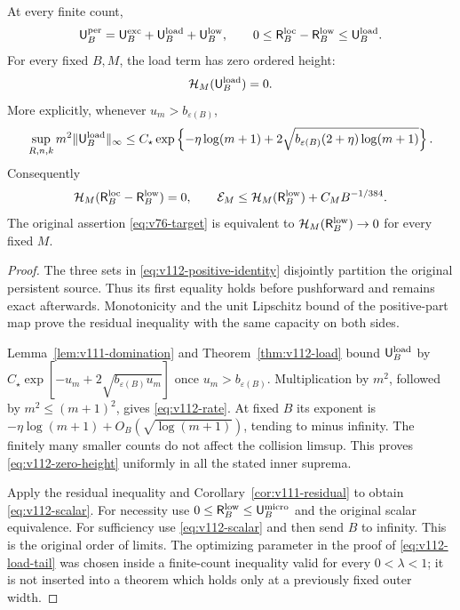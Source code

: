 \begin{theorem}
\label{thm:v112-payment}
At every finite count,
\begin{equation}\label{eq:v112-positive-identity}
 \mathsf U_B^{\rm per}
 =\mathsf U_B^{\rm exc}+\mathsf U_B^{\rm load}+\mathsf U_B^{\rm low},
 \qquad
 0\le\mathsf R_B^{\rm loc}-\mathsf R_B^{\rm low}
                     \le\mathsf U_B^{\rm load}.
\end{equation}
For every fixed $B,M$, the load term has zero ordered height:
\begin{equation}\label{eq:v112-zero-height}
                \mathcal H_M(\mathsf U_B^{\rm load})=0.
\end{equation}
More explicitly, whenever $u_m>b_{\varepsilon(B)}$,
\begin{equation}\label{eq:v112-rate}
 \sup_{R,n,k}m^2\|\mathsf U_B^{\rm load}\|_\infty
 \le C_\star\exp\left\{-\eta\log(m+1)
       +2\sqrt{b_{\varepsilon(B)}(2+\eta)\log(m+1)}\right\}.
\end{equation}
Consequently
\begin{equation}\label{eq:v112-scalar}
 \mathcal H_M(\mathsf R_B^{\rm loc}-\mathsf R_B^{\rm low})=0,
 \qquad
 \mathcal E_M\le\mathcal H_M(\mathsf R_B^{\rm low})+C_MB^{-1/384}.
\end{equation}
The original assertion \eqref{eq:v76-target} is equivalent to
$\mathcal H_M(\mathsf R_B^{\rm low})\to0$ for every fixed $M$.
\end{theorem}
\begin{proof}
The three sets in \eqref{eq:v112-positive-identity} disjointly
partition the original persistent source. Thus its first equality
holds before pushforward and remains exact afterwards. Monotonicity
and the unit Lipschitz bound of the positive-part map prove the
residual inequality with the same capacity on both sides.

Lemma~\ref{lem:v111-domination} and
Theorem~\ref{thm:v112-load} bound $\mathsf U_B^{\rm load}$ by
$C_\star\exp[-u_m+2\sqrt{b_{\varepsilon(B)}u_m}]$ once
$u_m>b_{\varepsilon(B)}$. Multiplication by $m^2$, followed by
$m^2\le(m+1)^2$, gives \eqref{eq:v112-rate}. At fixed $B$ its
exponent is $-\eta\log(m+1)+O_B(\sqrt{\log(m+1)})$, tending to
minus infinity. The finitely many smaller counts do not affect the
collision limsup. This proves \eqref{eq:v112-zero-height} uniformly
in all the stated inner suprema.

Apply the residual inequality and
Corollary~\ref{cor:v111-residual} to obtain
\eqref{eq:v112-scalar}. For necessity use
$0\le\mathsf R_B^{\rm low}\le\mathsf U_B^{\rm micro}$ and the
original scalar equivalence. For sufficiency use
\eqref{eq:v112-scalar} and then send $B$ to infinity. This is the
original order of limits. The optimizing parameter in the proof of
\eqref{eq:v112-load-tail} was chosen inside a finite-count
inequality valid for every $0<\lambda<1$; it is not inserted into
a theorem which holds only at a previously fixed outer width.
\end{proof}

